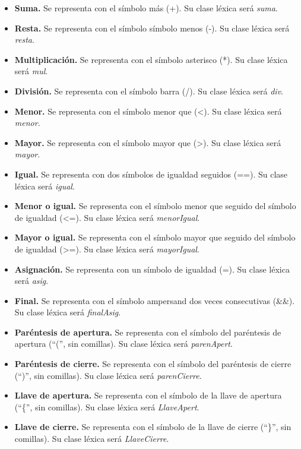 \begin{itemize}
    \item \textbf{Suma.} Se representa con el símbolo más (+). Su clase léxica será \textit{suma}.
    \item \textbf{Resta.} Se representa con el símbolo símbolo menos (-). Su clase léxica será \textit{resta}.
    \item \textbf{Multiplicación.} Se representa con el símbolo asterisco (*). Su clase léxica será \textit{mul}.
    \item \textbf{División.} Se representa con el símbolo barra (/). Su clase léxica será \textit{div}.
    \item \textbf{Menor.} Se representa con el símbolo menor que (<). Su clase léxica será \textit{menor}.
    \item \textbf{Mayor.} Se representa con el símbolo mayor que (>). Su clase léxica será \textit{mayor}.
    \item \textbf{Igual.} Se representa con dos símbolos de igualdad seguidos (==). Su clase léxica será \textit{igual}.
    \item \textbf{Menor o igual.} Se representa con el símbolo menor que seguido del símbolo de igualdad (<=). Su clase léxica será \textit{menorIgual}.
    \item \textbf{Mayor o igual.} Se representa con el símbolo mayor que seguido del símbolo de igualdad (>=). Su clase léxica será \textit{mayorIgual}.
    \item \textbf{Asignación.} Se representa con un símbolo de igualdad (=). Su clase léxica será \textit{asig}.
    \item \textbf{Final.} Se representa con el símbolo ampersand dos veces consecutivas (\&\&). Su clase léxica será \textit{finalAsig}.
    \item \textbf{Paréntesis de apertura.} Se representa con el símbolo del paréntesis de apertura (``('', sin comillas). Su clase léxica será \textit{parenApert}.
    \item \textbf{Paréntesis de cierre.} Se representa con el símbolo del paréntesis de cierre (``)'', sin comillas). Su clase léxica será \textit{parenCierre}.
    \item \textbf{Llave de apertura.} Se representa con el símbolo de la llave de apertura (``\{'', sin comillas). Su clase léxica será \textit{LlaveApert}.
    \item \textbf{Llave de cierre.} Se representa con el símbolo de la llave de cierre (``\}'', sin comillas). Su clase léxica será \textit{LlaveCierre}.

\end{itemize}
